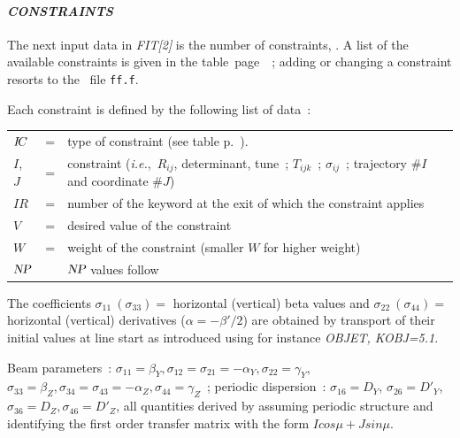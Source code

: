 \paragraph{\textit{CONSTRAINTS}}  

\noindent The next input data in \textsl{FIT[2]} is the number of constraints, \textsl{\NC}. 
A list of the available constraints is given in the table~page~\pageref{TabFITZlst1}~; adding or changing a constraint 
resorts to the \FORTRAN\ file \texttt{ff.f}. 

\medskip 

Each constraint is defined by the following list of data~: 

\begin{center}
	\begin{tabular}{lcp{15cm}}
	$I\!C$        &  = &  type of  constraint (see table p.~\pageref{TabFITZlst1}).\\
	$I$, $J$    & =  &  constraint (\emph{i.e.},~$R_{ij}$, determinant, tune~; 
	                    $T_{ijk}$~; $\sigma_{ ij}$~; trajectory $\#I$ and coordinate $\#J$)\\
	$IR$       &  =  &  number of the keyword at the exit of which the constraint applies   \\
	$V$        &  =  &  desired value of the constraint\\
	$W$        &  =  &  weight of the constraint (smaller $W$ for higher weight)  \\
        $\textsl{NP}$       &    &   $\textsl{NP}$ values follow 
	\end{tabular}
\end{center}



 The coefficients 
$ \sigma_{11}~(\sigma_{ 33}) = $ horizontal (vertical) beta values and 
$ \sigma_{ 22}~(\sigma_{ 44}) = $ horizontal (vertical) derivatives ($\alpha = -\beta'/2$) 
are obtained by transport of their initial values at line start as introduced using for instance  
\textsl{OBJET, KOBJ=5.1}.

\smallskip

 Beam parameters~: $\sigma_{11}=\beta_Y, \sigma_{12}=\sigma_{21}=-\alpha_Y, 
\sigma_{22}=\gamma_Y$, $\sigma_{33}=\beta_Z, \sigma_{34}=\sigma_{43}=-\alpha_Z, \sigma_{44}=\gamma_Z$~; periodic dispersion~: 
$\sigma_{16}=D_Y$, $\sigma_{26}=D'_Y$,  $\sigma_{36}=D_Z, \sigma_{46}=D'_Z$, all quantities derived by assuming 
 periodic structure and identifying the first order transfer matrix 
with the form   $I cos \mu + J sin \mu $. 


